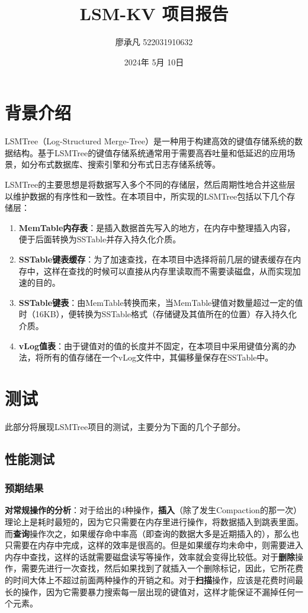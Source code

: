 \documentclass{article}
\title{LSM-KV 项目报告}
\author{廖承凡 522031910632}
\date{2024年 5月 10日}
\begin{document}
\maketitle

\section{背景介绍}

LSMTree（Log-Structured Merge-Tree）是一种用于构建高效的键值存储系统的数据结构。基于LSMTree的键值存储系统通常用于需要高吞吐量和低延迟的应用场景，如分布式数据库、搜索引擎和分布式日志存储系统等。

LSMTree的主要思想是将数据写入多个不同的存储层，然后周期性地合并这些层以维护数据的有序性和一致性。在本项目中，所实现的LSMTree包括以下几个存储层：

\begin{enumerate}
    \item \textbf{MemTable内存表}：是插入数据首先写入的地方，在内存中整理插入内容，便于后面转换为SSTable并存入持久化介质。
    \item \textbf{SSTable键表缓存}：为了加速查找，在本项目中选择将前几层的键表缓存在内存中，这样在查找的时候可以直接从内存里读取而不需要读磁盘，从而实现加速的目的。
    \item \textbf{SSTable键表}：由MemTable转换而来，当MemTable键值对数量超过一定的值时（16KB），便转换为SSTable格式（存储键及其值所在的位置）存入持久化介质。
    \item \textbf{vLog值表}：由于键值对的值的长度并不固定，在本项目中采用键值分离的办法，将所有的值存储在一个vLog文件中，其偏移量保存在SSTable中。
\end{enumerate}

\section{测试}

此部分将展现LSMTree项目的测试，主要分为下面的几个子部分。

\subsection{性能测试}

\subsubsection{预期结果}

\textbf{对常规操作的分析}：对于给出的4种操作，\textbf{插入}（除了发生Compaction的那一次）理论上是耗时最短的，因为它只需要在内存里进行操作，将数据插入到跳表里面。而\textbf{查询}操作次之，如果缓存命中率高（即查询的数据大多是近期插入的），那么也只需要在内存中完成，这样的效率是很高的。但是如果缓存均未命中，则需要进入内存中查找，这样的话就需要磁盘读写等操作，效率就会变得比较低。对于\textbf{删除}操作，需要先进行一次查找，然后如果找到了就插入一个删除标记，因此，它所花费的时间大体上不超过前面两种操作的开销之和。对于\textbf{扫描}操作，应该是花费时间最长的操作，因为它需要暴力搜索每一层出现的键值对，这样才能保证不漏掉任何一个元素。
\end{document}
